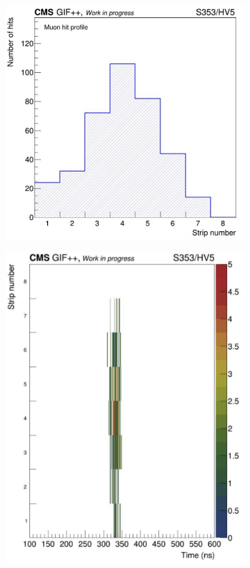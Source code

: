 	\begin{figure}[H]
		\begin{subfigure}{0.45\linewidth}
		    \centering
			\includegraphics[width = \linewidth]{fig/chapt6/iRPC-CMS_FEB-HitProfile.png}
			\caption{\label{fig:iRPC_CMS_Profiles:A}}
		\end{subfigure}
		\begin{subfigure}{0.45\linewidth}
		    \centering
			\includegraphics[width = \linewidth]{fig/chapt6/iRPC-CMS_FEB-TimeProfile.png}

\end{subfigure}
\end{figure}
